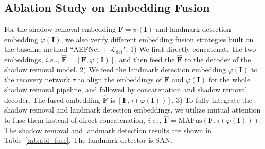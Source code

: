 \documentclass[10pt,twocolumn,letterpaper]{article}
\makeatletter
\newcommand{\tableref}[1]{Table~\ref{#1}}
\DeclareRobustCommand\onedot{\futurelet\@let@token\@onedot}
\def\@onedot{\ifx\@let@token.\else.\null\fi\xspace}
\def\ie{\emph{i.e}\onedot} \def\Ie{\emph{I.e}\onedot}
\makeatother
\begin{document}
\subsection{Ablation Study on Embedding Fusion}
For the shadow removal embedding $\mathbf{F}=\psi(\mathbf{I})$ and landmark detection embedding $\varphi(\mathbf{I})$, we also verify different embedding fusion strategies built on the baseline method ``AEFNet \cite{fu2021auto} + $\mathcal{L}_\mathrm{det}$". 1) We first directly concatenate the two embeddings, \ie, $\hat{\mathbf{F}} = [\mathbf{F}, \varphi(\mathbf{I})]$, and then feed the $\hat{\mathbf{F}}$ to the decoder of the shadow removal model. 2) We feed the landmark detection embedding $\varphi(\mathbf{I})$ to the recovery network $\tau$ to align the embeddings of $\mathbf{F}$ and $\varphi(\mathbf{I})$ for the whole shadow removal pipeline, and followed by concatenation and shadow removal decoder. The fused embedding $\hat{\mathbf{F}}$ is $[\mathbf{F}, \tau(\varphi(\mathbf{I}))]$. 3) To fully integrate the shadow removal and landmark detection embeddings, we utilize mutual attention to fuse them instead of direct concatenation, \ie, $\hat{\mathbf{F}} = \text{MAFus}(\mathbf{F},\tau(\varphi(\mathbf{I})))$. The shadow removal and landmark detection results are shown in \tableref{tab:abl_fuse}. The landmark detector is SAN.

\setcounter{table}{1}
\begin{table}[ht]
\caption{Ablation study of shadow removal and landmark detection results with different embedding fusion strategies on the $\mathcal{D}_\text{syn}$ dataset.}
\centering
\footnotesize
{}
\end{table}
\end{document}
